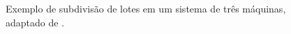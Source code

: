 \begin{figure}[!ht]
    \centering
\caption{Exemplo de subdivisão de lotes em um sistema de três máquinas, adaptado de \cite{Ventura2013}.}
\label{fig:LSBasic}
\end{figure}